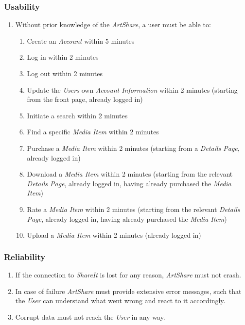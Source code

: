 \documentclass[../report.tex]{subfiles}
\begin{document}

\label{sec:Non-functional Requirements}

\subsubsection{Usability}

\begin{enumerate}[label=\textbf{NFR-\twodigits*}]
\item Without prior knowledge of the \textit{ArtShare}, a user must be able to:
	\begin{enumerate}
	\item Create an \textit{Account} within 5 minutes
	\item Log in within 2 minutes
	\item Log out within 2 minutes
	\item Update the \textit{Users} own \textit{Account Information} within 2 minutes (starting from the front page, already logged in)
	\item Initiate a search within 2 minutes
	\item Find a specific \textit{Media Item} within 2 minutes
	\item Purchase a \textit{Media Item} within 2 minutes (starting from a \textit{Details Page}, already logged in)
	\item Download a \textit{Media Item} within 2 minutes (starting from the relevant \textit{Details Page}, already logged in, having already purchased the \textit{Media Item})
	\item Rate a \textit{Media Item} within 2 minutes (starting from the relevant \textit{Details Page}, already logged in, having already purchased the \textit{Media Item})
	\item Upload a \textit{Media Item} within 2 minutes (already logged in)
	\end{enumerate}
\end{enumerate}

\subsubsection{Reliability}

\begin{enumerate}[label=\textbf{NFR-\twodigits*}, resume]
\item If the connection to \textit{ShareIt} is lost for any reason, \textit{ArtShare} must not crash. 
\item In case of failure \textit{ArtShare} must provide extensive error messages, such that the \textit{User} can understand what went wrong and react to it accordingly.
\item Corrupt data must not reach the \textit{User} in any way.
\end{enumerate}
\end{document}
